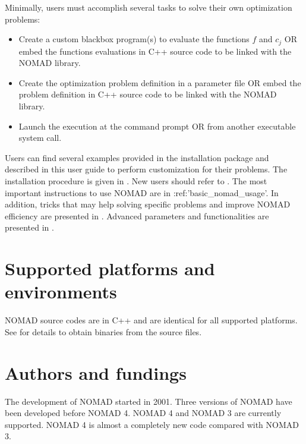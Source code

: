 \documentclass[letterpaper,10pt,english]{sphinxmanual}
\begin{document}
\sphinxAtStartPar
Minimally, users must accomplish several tasks to solve their own optimization problems:
\begin{itemize}
\item {} 
\sphinxAtStartPar
Create a custom blackbox program(s) to evaluate the functions \(f\) and \(c_j\) OR embed
the functions evaluations in C++ source code to be linked with the NOMAD library.

\item {} 
\sphinxAtStartPar
Create the optimization problem definition in a parameter file OR embed the problem definition in C++ source code to be linked with the NOMAD library.

\item {} 
\sphinxAtStartPar
Launch the execution at the command prompt OR from another executable system call.

\end{itemize}

\sphinxAtStartPar
Users can find several examples provided in the installation package and described in this user guide to perform customization for their problems.
The installation procedure is given in {\hyperref[\detokenize{Installation:installation}]{}}. New users should refer to {\hyperref[\detokenize{GettingStarted:getting-started}]{}}.
The most important instructions to use NOMAD are in :ref:’basic\_nomad\_usage’.
In addition, tricks that may help solving specific problems and improve NOMAD efficiency are presented in {\hyperref[\detokenize{TricksOfTheTrade:tricks-of-the-trade}]{}}.
Advanced parameters and functionalities are presented in {\hyperref[\detokenize{AdvancedFunctionalities:advanced-functionalities}]{}}.


\section{Supported platforms and environments}
\label{\detokenize{Introduction:supported-platforms-and-environments}}
\sphinxAtStartPar
NOMAD source codes are in C++ and are identical for all supported platforms.
See {\hyperref[\detokenize{Installation:installation}]{}} for details to obtain binaries from the source files.


\section{Authors and fundings}
\label{\detokenize{Introduction:authors-and-fundings}}
\sphinxAtStartPar
The development of NOMAD started in 2001. Three versions of NOMAD have been developed before NOMAD 4.
NOMAD 4 and NOMAD 3 are currently supported. NOMAD 4 is almost a completely new code compared with NOMAD 3.
\end{document}
